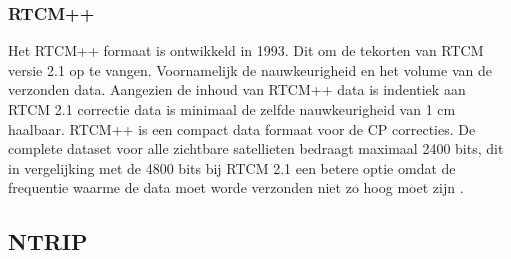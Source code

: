 \subsubsection{RTCM++}
Het RTCM++ formaat is ontwikkeld in 1993. Dit om de tekorten van RTCM versie 2.1 op te vangen. Voornamelijk de nauwkeurigheid en het volume van de verzonden data. Aangezien de inhoud van RTCM++ data is indentiek aan RTCM 2.1 correctie data is minimaal de zelfde nauwkeurigheid van 1 cm haalbaar\cite{LBibRTCM3}. RTCM++ is een compact data formaat voor de CP correcties. De complete dataset voor alle zichtbare satellieten bedraagt maximaal 2400 bits, dit in vergelijking met de 4800 bits bij RTCM 2.1 een betere optie omdat de frequentie waarme de data moet worde verzonden niet zo hoog moet zijn \cite{LBibRTCM4}. 


\subsection{NTRIP}
\label{LNTR}
